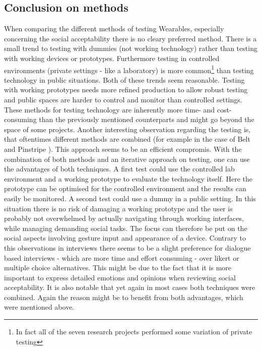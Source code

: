 \documentclass{sigchi}
\begin{document}
\subsection{Conclusion on methods}
When comparing the different methods of testing Wearables, especially concerning the social acceptability there is no cleary preferred method. There is a small trend to testing with dummies (not working technology) rather than testing with working devices or prototypes. Furthermore testing in controlled environments (private settings - like a laboratory) is more common\footnote{In fact all of the seven research projects performed some variation of private testing} than testing technology in public situations. Both of these trends seem reasonable. Testing with working prototypes needs more refined production to allow robust testing and public spaces are harder to control and monitor than controlled settings. These methods for testing technology are inherently more time- and cost-consuming than the previously mentioned counterparts and might go beyond the space of some projects.
Another interesting observation regarding the testing is, that oftentimes different methods are combined (for example in the case of Belt \cite{belt} and Pinstripe \cite{pinstripe}). This approach seems to be an efficient compromis. With the combination of both methods and an iterative approach on testing, one can use the advantages of both techniques. A first test could use the controlled lab environment and a working prototype to evaluate the technology itself. Here the prototype can be optimised for the controlled environment and the results can easily be monitored. A second test could use a dummy in a public setting. In this situation there is no risk of damaging a working prototype and the user is probably not overwhelmed by actually navigating through working interfaces, while managing demanding social tasks. The focus can therefore be put on the social aspects involving gesture input and appearance of a device.
Contrary to this observations in interviews there seems to be a slight preference for dialogue based interviews - which are more time and effort consuming - over likert or multiple choice alternatives. This might be due to the fact that it is more important to express detailed emotions and opinions when reviewing social acceptability.
It is also notable that yet again in most cases both techniques were combined. Again the reason might be to benefit from both advantages, which were mentioned above.
\end{document}

